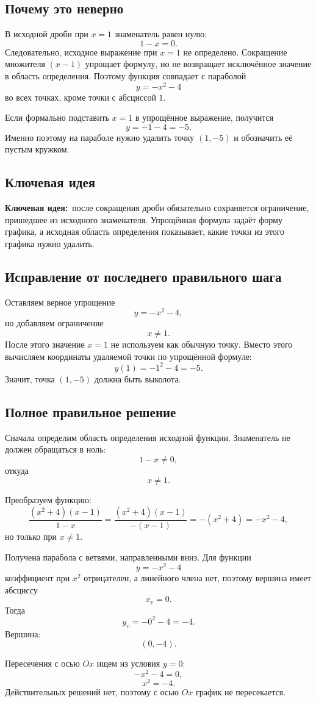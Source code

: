 \documentclass[12pt,a4paper]{article}
\newcommand{\keyidea}{\textcolor{blue!60!black}{\textbf{Ключевая идея:}}}
\begin{document}
\subsection*{Почему это неверно}
В исходной дроби при $x=1$ знаменатель равен нулю:
\[
1-x=0.
\]
Следовательно, исходное выражение при $x=1$ не определено. Сокращение множителя $(x-1)$ упрощает формулу, но не возвращает исключённое значение в область определения. Поэтому функция совпадает с параболой
\[
y=-x^2-4
\]
во всех точках, кроме точки с абсциссой $1$.

Если формально подставить $x=1$ в упрощённое выражение, получится
\[
y=-1-4=-5.
\]
Именно поэтому на параболе нужно удалить точку $(1,-5)$ и обозначить её пустым кружком.

\subsection*{Ключевая идея}
\keyidea\ после сокращения дроби обязательно сохраняется ограничение, пришедшее из исходного знаменателя. Упрощённая формула задаёт форму графика, а исходная область определения показывает, какие точки из этого графика нужно удалить.

\subsection*{Исправление от последнего правильного шага}
Оставляем верное упрощение
\[
y=-x^2-4,
\]
но добавляем ограничение
\[
x\ne1.
\]
После этого значение $x=1$ не используем как обычную точку. Вместо этого вычисляем координаты удаляемой точки по упрощённой формуле:
\[
y(1)=-1^2-4=-5.
\]
Значит, точка $(1,-5)$ должна быть выколота.

\subsection*{Полное правильное решение}
Сначала определим область определения исходной функции. Знаменатель не должен обращаться в ноль:
\[
1-x\ne0,
\]
откуда
\[
x\ne1.
\]

Преобразуем функцию:
\[
\frac{(x^2+4)(x-1)}{1-x}
=
\frac{(x^2+4)(x-1)}{-(x-1)}
=-(x^2+4)
=-x^2-4,
\]
но только при $x\ne1$.

Получена парабола с ветвями, направленными вниз. Для функции
\[
y=-x^2-4
\]
коэффициент при $x^2$ отрицателен, а линейного члена нет, поэтому вершина имеет абсциссу
\[
x_v=0.
\]
Тогда
\[
y_v=-0^2-4=-4.
\]
Вершина:
\[
(0,-4).
\]

Пересечения с осью $Ox$ ищем из условия $y=0$:
\[
-x^2-4=0,
\]
\[
x^2=-4.
\]
Действительных решений нет, поэтому с осью $Ox$ график не пересекается.
\end{document}

